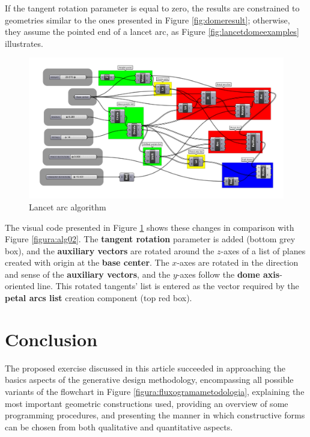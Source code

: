 \documentclass[preprint,12pt,3p]{elsarticle}
\begin{document}
If the tangent rotation parameter is equal to zero, the results are constrained to geometries similar to the ones presented in Figure \ref{fig:domeresult}; otherwise, they assume the pointed end of a lancet arc, as Figure \ref{fig:lancetdomeexamples} illustrates.

\begin{figure}[!h]
\begin{center}
\includegraphics[width=0.95
\textwidth]{alg03.png}
\caption{Lancet arc algorithm}
\label{figura:alg03}
\end{center}
\end{figure}

The visual code presented in Figure \ref{figura:alg03} shows these changes in comparison with Figure \ref{figura:alg02}. The \textbf{tangent rotation} parameter is added (bottom grey box), and the \textbf{auxiliary vectors} are rotated around the $z$-axes of a list of planes created with origin at the \textbf{base center}. The $x$-axes are rotated in the direction and sense of the \textbf{auxiliary vectors}, and the $y$-axes follow the \textbf{dome axis}-oriented line. This rotated tangents' list is entered as the vector required by the \textbf{petal arcs list} creation component (top red box). 


\section{Conclusion}
\label{conc}

The proposed exercise discussed in this article succeeded in approaching the basics aspects of the generative design methodology, encompassing all possible variants of the flowchart in Figure \ref{figura:fluxogramametodologia}, explaining the most important geometric constructions used, providing an overview of some programming procedures, and presenting the manner in which constructive forms can be chosen from both qualitative and quantitative aspects.
\end{document}
